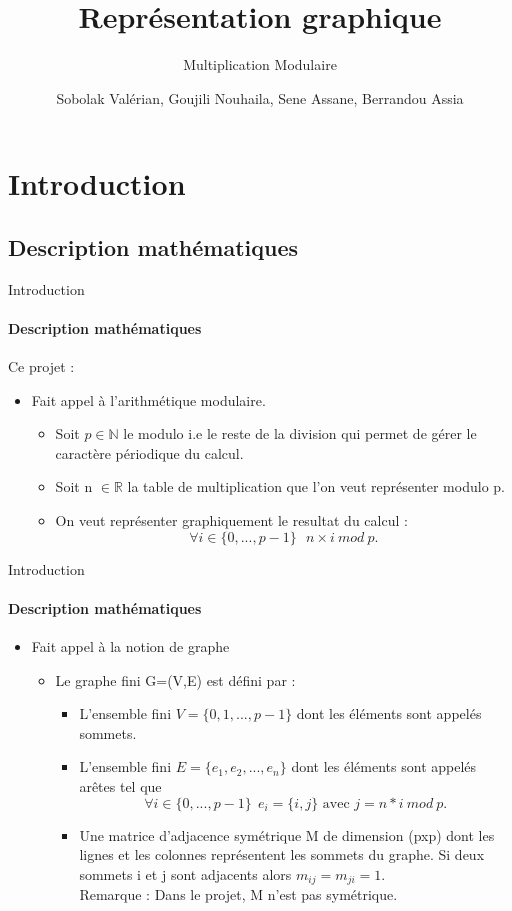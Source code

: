 \documentclass{beamer}
\title[Multiplication Modulaire] 
{Représentation graphique}
\subtitle{Multiplication Modulaire}
\author{Sobolak Valérian, Goujili Nouhaila, Sene Assane, Berrandou Assia}
\institute[VFU] %
{Université de Montpellier}
\begin{document}
\frame{\titlepage}

\begin {frame}
\tableofcontents
\end{frame}

\section{Introduction}
\subsection{Description mathématiques}
\begin{frame}{Introduction}
\framesubtitle{Description mathématiques}
Ce projet : 
\begin{itemize}
\item Fait appel à l'arithmétique modulaire. 
\begin{itemize}
\item Soit $p\in \mathbb{N}$ le modulo i.e le reste de la division qui permet de gérer le caractère périodique du calcul.
\item Soit n $\in \mathbb{R}$ la table de multiplication que l'on veut représenter modulo p.
\item On veut représenter graphiquement le resultat du calcul : $$\forall i \in \{0, ..., p-1\} \ \ \   n \times i \  mod  \ p.$$
\end{itemize}
\end{itemize}
\end{frame}

\begin{frame}{Introduction}
\framesubtitle{Description mathématiques}
\begin{itemize}
\item Fait appel à la notion de graphe
\begin{itemize} 
\item Le graphe fini G=(V,E) est défini par :
\begin{itemize}
\item L’ensemble fini $V=\{0,1,...,p-1\}$ dont les éléments sont appelés sommets.
\item L’ensemble fini $E=\{e_1,e_2,...,e_n\}$ dont les éléments sont appelés arêtes tel que $$\forall i \in \{0,..., p-1\} \ \  e_i = \{i, j\} \text{ avec } j = n * i \ mod \ p.$$
\item  Une matrice d’adjacence symétrique M de dimension (pxp) dont les lignes et les colonnes représentent les sommets du graphe.
Si deux sommets i et j sont adjacents alors $m_{ij}=m_{ji}=1$. \\ 
Remarque : Dans le projet, M n'est pas symétrique.
\end{itemize}
\end{itemize}
\end{itemize}
\end{frame}
\end{document}
